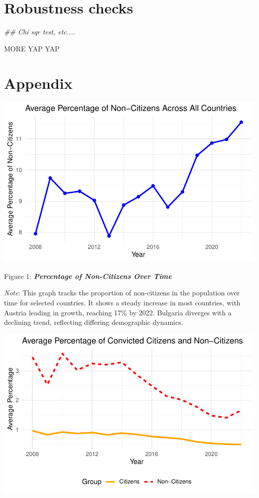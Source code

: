 \documentclass[
]{article}
\newenvironment{Shaded}{\begin{snugshade}}{\end{snugshade}}
\newcommand{\DocumentationTok}[1]{\textcolor[rgb]{0.37,0.37,0.37}{\textit{#1}}}
\begin{document}
\section{Robustness checks}\label{robustness-checks}

\begin{Shaded}
\begin{Highlighting}[]
\DocumentationTok{\#\# Chi sqr test, etc....}
\end{Highlighting}
\end{Shaded}

MORE YAP YAP

\section{Appendix}\label{appendix}

\includegraphics{DataMan_Project_files/figure-pdf/unnamed-chunk-25-1.pdf}

Figure 1: \textbf{\emph{Percentage of Non-Citizens Over Time}}

\emph{Note}: This graph tracks the proportion of non-citizens in the
population over time for selected countries. It shows a steady increase
in most countries, with Austria leading in growth, reaching 17\% by
2022. Bulgaria diverges with a declining trend, reflecting differing
demographic dynamics.

\includegraphics{DataMan_Project_files/figure-pdf/unnamed-chunk-26-1.pdf}
\end{document}

